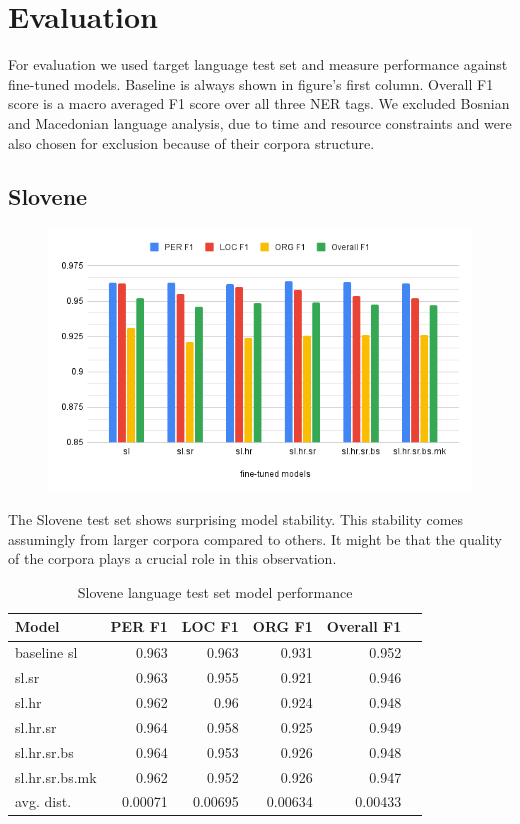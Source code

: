 \documentclass[sigconf]{acmart}
\begin{document}
\section{Evaluation}
For evaluation we used target language test set and measure performance against fine-tuned models.
Baseline is always shown in figure's first column.
Overall F1 score is a macro averaged F1 score over all three NER tags.
We excluded Bosnian and Macedonian language analysis, due to time and resource constraints and were also chosen for exclusion because of their corpora structure.

\subsection{Slovene}

\begin{figure}[H]
  \label{fig:eval_sl}
  \centering
  \includegraphics[width=\linewidth]{eval_sl}
\end{figure}

The Slovene test set shows surprising model stability.
This stability comes assumingly from larger corpora compared to others.
It might be that the quality of the corpora plays a crucial role in this observation.

\begin{table}[H]
  \caption{Slovene language test set model performance}
  \label{tab:eval_sl}
  \begin{tabular}{lrrrrr}
    \toprule
    Model&PER F1&LOC F1&ORG F1&Overall F1\\
    \midrule
    baseline sl&0.963&0.963&0.931&0.952\\
    \midrule
    sl.sr&0.963&0.955&0.921&0.946\\
    sl.hr&0.962&0.96&0.924&0.948\\
    sl.hr.sr&0.964&0.958&0.925&0.949\\
    sl.hr.sr.bs&0.964&0.953&0.926&0.948\\
    sl.hr.sr.bs.mk&0.962&0.952&0.926&0.947\\
    \midrule
    avg. dist.&0.00071&0.00695&0.00634&0.00433\\
    \bottomrule
  \end{tabular}
\end{table}
\end{document}
